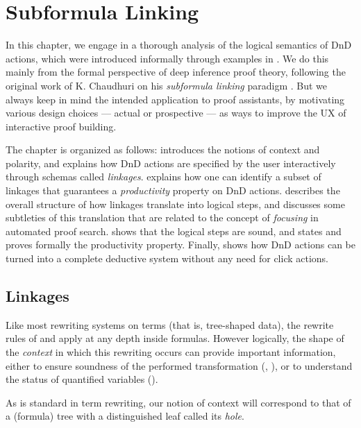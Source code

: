 \setchapterpreamble[u]{\margintoc}
\chapter{Subformula Linking}

In this chapter, we engage in a thorough analysis of the logical semantics of
DnD actions, which were introduced informally through examples in .
We do this mainly from the formal perspective of deep inference proof theory,
following the original work of K. Chaudhuri on his \emph{subformula linking}
paradigm \cite{Chaudhuri2013}. But we always keep in mind the intended
application to proof assistants, by motivating various design choices --- actual
or prospective --- as ways to improve the UX of interactive proof building.

The chapter is organized as follows:  introduces the notions of
context and polarity, and explains how DnD actions are specified by the user
interactively through schemas called \emph{linkages}.  explains
how one can identify a subset of linkages that guarantees a \emph{productivity}
property on DnD actions.  describes the overall structure of how
linkages translate into logical steps, and  discusses some
subtleties of this translation that are related to the concept of
\emph{focusing} in automated proof search.  shows that the
logical steps are sound, and  states and proves formally
the productivity property. Finally,  shows how DnD
actions can be turned into a complete deductive system without any need for
click actions.

\section{Linkages}

Like most rewriting systems on terms (that is, tree-shaped data), the rewrite
rules of  and  apply at any depth inside formulas.
However logically, the shape of the \emph{context} in which this rewriting
occurs can provide important information, either to ensure soundness of the
performed transformation (, ), or 
to understand the status of quantified variables ().

As is standard in term rewriting, our notion of context will correspond to that
of a (formula) tree with a distinguished leaf called its \emph{hole}.

